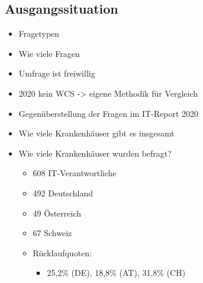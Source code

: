 \subsection{Ausgangssituation}
\begin{itemize}
	\item Fragetypen
	\item Wie viele Fragen
	\item Umfrage ist freiwillig
	\item 2020 kein WCS -> eigene Methodik für Vergleich
	\item Gegenüberstellung der Fragen im IT-Report 2020 \parencite{huebner2020}
	\item Wie viele Krankenhäuser gibt es insgesamt
	\item Wie viele Krankenhäuser wurden befragt? \parencite[31]{huebner2020}
	\begin{itemize}
		\item 608 IT-Verantwortliche
		\item 492 Deutschland
		\item 49 Österreich
		\item 67 Schweiz
		\item Rücklaufquoten:
		\begin{itemize}
			\item 25,2\% (DE), 18,8\% (AT), 31,8\% (CH)
		\end{itemize}
	\end{itemize}
\end{itemize}
